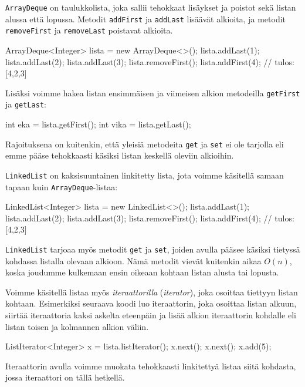 \texttt{ArrayDeque} on taulukkolista,
joka sallii tehokkaat lisäykset ja poistot
sekä listan alussa että lopussa.
Metodit \texttt{addFirst} ja \texttt{addLast}
lisäävät alkioita,
ja metodit \texttt{removeFirst} ja \texttt{removeLast}
poistavat alkioita.

\begin{code}
ArrayDeque<Integer> lista = new ArrayDeque<>();
lista.addLast(1);
lista.addLast(2);
lista.addLast(3);
lista.removeFirst();
lista.addFirst(4);
// tulos: [4,2,3]
\end{code}

Lisäksi voimme hakea listan ensimmäisen ja viimeisen alkion
metodeilla \texttt{getFirst} ja \texttt{getLast}:

\begin{code}
int eka = lista.getFirst();
int vika = lista.getLast();
\end{code}

Rajoituksena on kuitenkin, että yleisiä metodeita
\texttt{get} ja \texttt{set} ei ole tarjolla
eli emme pääse tehokkaasti käsiksi listan keskellä
oleviin alkioihin.

\texttt{LinkedList} on kaksisuuntainen linkitetty lista,
jota voimme käsitellä samaan tapaan kuin \texttt{ArrayDeque}-listaa:

\begin{code}
LinkedList<Integer> lista = new LinkedList<>();
lista.addLast(1);
lista.addLast(2);
lista.addLast(3);
lista.removeFirst();
lista.addFirst(4);
// tulos: [4,2,3]
\end{code}

\texttt{LinkedList} tarjoaa myös metodit
\texttt{get} ja \texttt{set}, joiden avulla
pääsee käsiksi tietyssä kohdassa listalla olevaan alkioon.
Nämä metodit vievät kuitenkin aikaa $O(n)$,
koska joudumme kulkemaan ensin oikeaan kohtaan listan
alusta tai lopusta.


Voimme käsitellä listaa myös \emph{iteraattorilla}
(\emph{iterator}),
joka osoittaa tiettyyn listan kohtaan.
Esimerkiksi seuraava koodi luo iteraattorin,
joka osoittaa listan alkuun,
siirtää iteraattoria kaksi askelta eteenpäin ja
lisää alkion iteraattorin kohdalle eli listan
toisen ja kolmannen alkion väliin.

\begin{code}
ListIterator<Integer> x = lista.listIterator();
x.next();
x.next();
x.add(5);
\end{code}

Iteraattorin avulla voimme muokata tehokkaasti
linkitettyä listaa siitä kohdasta,
jossa iteraattori on tällä hetkellä.

